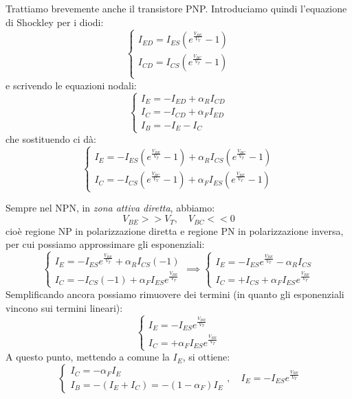 \documentclass[a4paper,11pt]{article}
\begin{document}
\noindent
Trattiamo brevemente anche il transistore PNP.
Introduciamo quindi l'equazione di Shockley per i diodi:
$$
\begin{cases}
	I_{ED} = I_{ES} \left( e^\frac{V_{BE}}{V_T} - 1 \right) \\
	I_{CD} = I_{CS} \left( e^\frac{V_{BC}}{V_T} - 1 \right) \\
\end{cases}
$$
e scrivendo le equazioni nodali:
$$
\begin{cases}
I_E = -I_{ED} + \alpha_R I_{CD} \\
I_C = -I_{CD} + \alpha_F I_{ED} \\
I_B = -I_E - I_C
\end{cases}
$$
che sostituendo ci dà:
$$
\begin{cases}
I_E = -I_{ES} \left( e^\frac{V_{BE}}{V_T} - 1 \right) + \alpha_R I_{CS} \left( e^\frac{V_{BC}}{V_T} - 1 \right) \\
I_C = -I_{CS} \left( e^\frac{V_{BC}}{V_T} - 1 \right) + \alpha_F I_{ES} \left( e^\frac{V_{BE}}{V_T} - 1 \right)
\end{cases}
$$

\newpage

Sempre nel NPN, in \textit{zona attiva diretta}, abbiamo:
$$
V_{BE} >> V_T, \quad V_{BC} << 0
$$
cioè regione NP in polarizzazione diretta e regione PN in polarizzazione inversa, per cui possiamo approssimare gli esponenziali:
$$
\begin{cases}
	I_E = -I_{ES} e^{\frac{V_{BE}}{V_T}} + \alpha_R I_{CS} (-1) \\
	I_C = -I_{CS} (-1) + \alpha_F I_{ES} e^{\frac{V_{BE}}{V_T}}
\end{cases}
\implies
\begin{cases}
	I_E = -I_{ES} e^{\frac{V_{BE}}{V_T}} - \alpha_R I_{CS} \\
	I_C = +I_{CS} + \alpha_F I_{ES} e^{\frac{V_{BE}}{V_T}}
\end{cases}
$$
Semplificando ancora possiamo rimuovere dei termini (in quanto gli esponenziali vincono sui termini lineari):
$$
\begin{cases}
	I_E = -I_{ES} e^{\frac{V_{BE}}{V_T}} \\
	I_C = +\alpha_F I_{ES} e^{\frac{V_{BE}}{V_T}}
\end{cases}
$$
A questo punto, mettendo a comune la $I_E$, si ottiene:
$$
\begin{cases}
I_C = - \alpha_F I_E \\
I_B = -(I_E + I_C) = - (1 - \alpha_F) I_E
\end{cases}, \quad
I_E = -I_{ES} e^{\frac{V_{BE}}{V_T}}
$$
\end{document}
